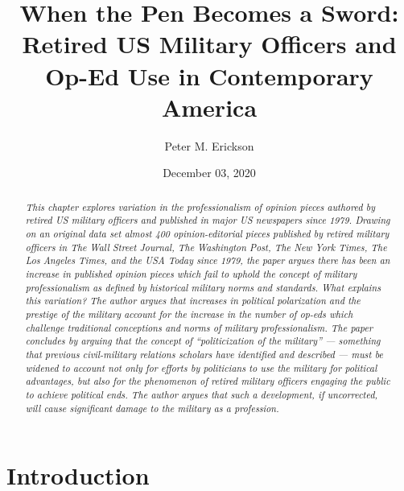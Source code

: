 \documentclass[12pt,]{article}
\title{When the Pen Becomes a Sword: Retired US Military Officers and Op-Ed Use in Contemporary America}
\author{Peter M. Erickson}
\date{December 03, 2020}
\begin{document}
\maketitle
\begin{abstract}
\emph{This chapter explores variation in the professionalism of opinion pieces authored by retired US military officers and published in major US newspapers since 1979. Drawing on an original data set almost 400 opinion-editorial pieces published by retired military officers in The Wall Street Journal, The Washington Post, The New York Times, The Los Angeles Times, and the USA Today since 1979, the paper argues there has been an increase in published opinion pieces which fail to uphold the concept of military professionalism as defined by historical military norms and standards. What explains this variation? The author argues that increases in political polarization and the prestige of the military account for the increase in the number of op-eds which challenge traditional conceptions and norms of military professionalism. The paper concludes by arguing that the concept of ``politicization of the military'' --- something that previous civil-military relations scholars have identified and described --- must be widened to account not only for efforts by politicians to use the military for political advantages, but also for the phenomenon of retired military officers engaging the public to achieve political ends. The author argues that such a development, if uncorrected, will cause significant damage to the military as a profession.}\\
\end{abstract}

\doublespacing

\captionsetup[table]{labelformat=empty}

\newpage

\hypertarget{introduction}{%
\section{Introduction}\label{introduction}}
\end{document}
